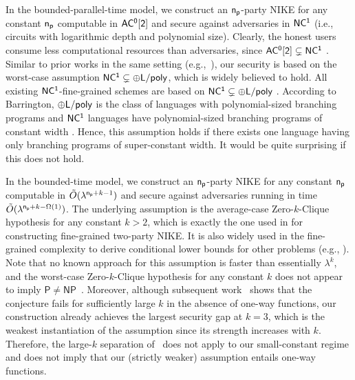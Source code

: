 \begin{compactitem}
\item In the bounded-parallel-time model, we construct an $\mathsf{n_p}$-party NIKE for any constant $\mathsf{n_p}$ computable in $\mathsf{AC^0[2]}$ and secure against adversaries in $\mathsf{NC^1}$ ({i.e., circuits with logarithmic depth and polynomial size}).
Clearly, the honest users consume less computational resources than adversaries, since $\mathsf{AC^0[2]}\subsetneq\mathsf{NC^1}$ \cite{Razborov1987,STOC:Smolensky87}.
Similar to prior works in the same setting (e.g.,~\cite{C:DegVaiVas16,TCC:CamGen18}), our security is based on the worst-case assumption $\mathsf{NC^1} \subsetneq {\sf \oplus L/poly}$, which is widely believed to hold.
All existing $\mathsf{NC^1}$-fine-grained schemes are based on $\mathsf{NC^1} \subsetneq {\sf \oplus L/poly}$ \cite{C:DegVaiVas16,TCC:CamGen18,C:BalDacKul20,C:WanPanChe21,JC:EgaWanTan21,EC:WanPan22}. According to Barrington, ${\sf \oplus L/poly}$ is the class of languages with polynomial-sized branching programs and $\mathsf{NC^1}$ languages have polynomial-sized branching programs of constant width \cite{STOC:Barrington86}. Hence, this assumption holds if there exists one language having only branching programs of super-constant width. It would be quite surprising if this does not hold.

\item In the bounded-time model, we construct an $\mathsf{n_p}$-party NIKE for any constant $\mathsf{n_p}$ computable in $\tilde{O}(\lambda^{\mathsf{n_p}+k-1})$ and secure against adversaries running in time $\tilde{O}(\lambda^{\mathsf{n_p} + k-\Omega(1)})$.
The underlying assumption is the average-case Zero-$k$-Clique hypothesis for any constant $k>2$, which is exactly the one used in \cite{C:LaVLinWil19} for constructing fine-grained two-party NIKE.  It is also widely used in the fine-grained complexity to derive conditional lower bounds for other problems (e.g., \cite{ICALP:AbbWilWei14,SODA:BGMW18,SODA:LinWilWil18,ICML:BacTza17}). 
Note that no known approach for this assumption is faster than essentially $\lambda^k$, and the worst-case Zero-$k$-Clique hypothesis for any constant $k$ does not appear to imply $\mathsf P\neq\mathsf{NP}$~\cite{C:LaVLinWil19}. Moreover, although subsequent work~\cite{EC:AlmHuaYeo25} shows that the conjecture fails for sufficiently large $k$ in the absence of one-way functions, our construction already achieves the largest security gap at $k=3$, which is the weakest instantiation of the assumption since its strength increases with $k$. 
Therefore, the large-$k$ separation of~\cite{EC:AlmHuaYeo25} does not apply to our small-constant regime and does not imply that our (strictly weaker) assumption entails one-way functions.


\end{compactitem}
